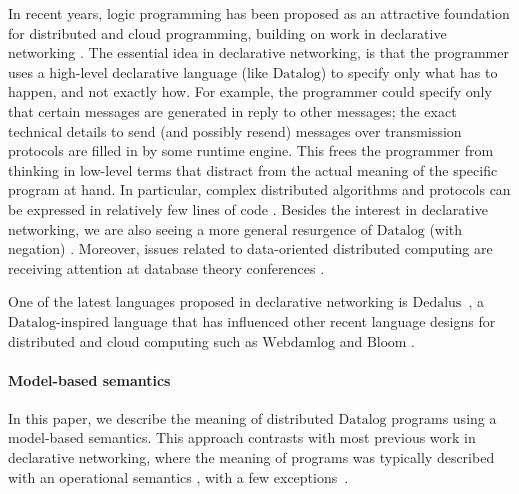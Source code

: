 \documentclass{tlp}
\newcommand{\langname}[1]{\text{#1}}  \newcommand{\pred}[1]{\mathtt{#1}}  \newcommand{\fname}[1]{\mathit{#1}}  \newcommand{\sq}[1]{`{#1}'}
\newcommand{\dedalus}{\langname{Dedalus}}
\newcommand{\datalog}{\langname{Datalog}}
\newcommand{\webdamlog}{\langname{Webdamlog}}
\begin{document}
In recent years, logic programming has been proposed as an attractive
foundation for distributed and cloud programming, building on work
in declarative networking \cite{decl_netw_cacm}.
The essential idea in declarative networking, is that the programmer uses a high-level declarative language (like $\datalog$) to specify only what has to happen, and not exactly how. 
For example, the programmer could specify only that certain messages are generated in reply to other messages; the exact technical details to send (and possibly resend) messages over transmission protocols are filled in by some runtime engine. This frees the programmer from thinking in low-level terms that distract from the actual meaning of the specific program at hand. 
In particular, complex distributed algorithms and protocols
can be expressed in relatively few lines of code \cite{trevor_SD3,i-do-declare,hellerstein_declimp}.
Besides the interest in declarative networking, we are also seeing a more general resurgence of $\datalog$ (with negation)
\cite{datalog2.0,datalog_sigmod}. 
Moreover, issues related to data-oriented distributed computing are receiving attention at database theory conferences \cite{hellerstein_datalog_talk,rtdn_pods,webdamlog,ameloot_consistency,green_winmove}.

One of the latest languages proposed in declarative networking is
$\dedalus$~\cite{dedalus,dedalus-datalog20,hellerstein_declimp},
a $\datalog$-inspired language that has influenced other recent language
designs for distributed and cloud computing such as $\webdamlog$
\cite{webdamlog} and $\langname{Bloom}$ \cite{hellerstein_calm}.

\paragraph*{Model-based semantics}

In this paper, we describe the meaning of distributed $\datalog$
programs using a model-based semantics. This approach contrasts with
most previous work in declarative networking, where the meaning of
programs was typically described with an operational semantics \cite{deutsch_network,declnetw_opsem,grumbach_netlog,rtdn_pods},
with a few exceptions~\cite{lobo_2012,ma_decldist}. 
\end{document}
